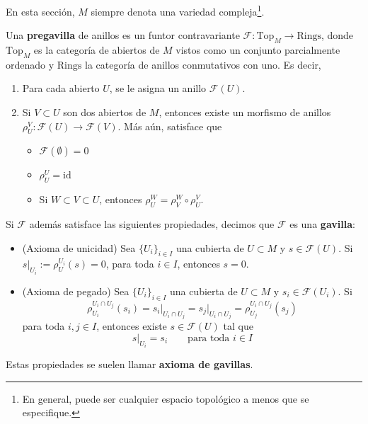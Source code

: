    En esta sección, $M$ siempre denota una variedad compleja\footnote{En general, puede ser cualquier espacio topológico a menos que se especifique.}. 
\begin{definition}
    Una \textbf{pregavilla} de anillos es un funtor contravariante $\mathscr{F}:\mathrm{Top}_M\longrightarrow \mathrm{Rings}$, donde $\mathrm{Top}_M$ es la categoría de abiertos de $M$ vistos como un conjunto parcialmente ordenado y $\mathrm{Rings}$ la categoría de anillos conmutativos con uno. Es decir,
    \begin{enumerate}
        \item Para cada abierto $U$, se le asigna un anillo $\mathscr{F}(U)$.
        \item Si $V\subset U$ son dos abiertos de $M$, entonces existe un morfismo de anillos $\rho_{U}^V:\mathscr{F}(U)\to \mathscr{F}(V)$. Más aún, satisface que
        \begin{itemize}
            \item $\mathscr{F}(\emptyset)=0$
            \item $\rho_{U}^{U}=\mathrm{id}$
            \item Si $W\subset V \subset U$, entonces $\rho_U^W=\rho_V^W\circ \rho_U^V$.
        \end{itemize}
        
    \end{enumerate}
    Si $\mathscr{F}$ además satisface las siguientes propiedades, decimos que $\mathscr{F}$ es una \textbf{gavilla}:
    \begin{itemize}
    	\item [1)] (Axioma de unicidad) Sea $\{U_i\}_{i\in I}$ una cubierta de $U\subset M$ y $s\in\mathscr{F}(U)$. Si $s\left.\right|_{U_i}:=\rho_U^{U_i}(s)=0$, para toda $i\in I$, entonces $s=0$.
    	\item [2)] (Axioma de pegado) Sea $\{U_i\}_{i\in I}$ una cubierta de $U\subset M$ y $s_i\in\mathscr{F}(U_i)$. Si
    	\begin{equation*}
    		\rho_{U_i}^{U_i\cap U_j}(s_i)=s_i\left.\right|_{U_i\cap U_j}= s_j\left.\right|_{U_i\cap U_j}=\rho_{U_j}^{U_i\cap U_j}(s_j)
    	\end{equation*}
    	para toda $i,j\in I$, entonces existe $s\in \mathscr{F}(U)$ tal que 
    	\begin{equation*}
    		s\left.\right|_{U_i}=s_i\qquad \text{para toda }i\in I
    	\end{equation*}
    \end{itemize}
    Estas propiedades se suelen llamar \textbf{axioma de gavillas}.
\end{definition}


